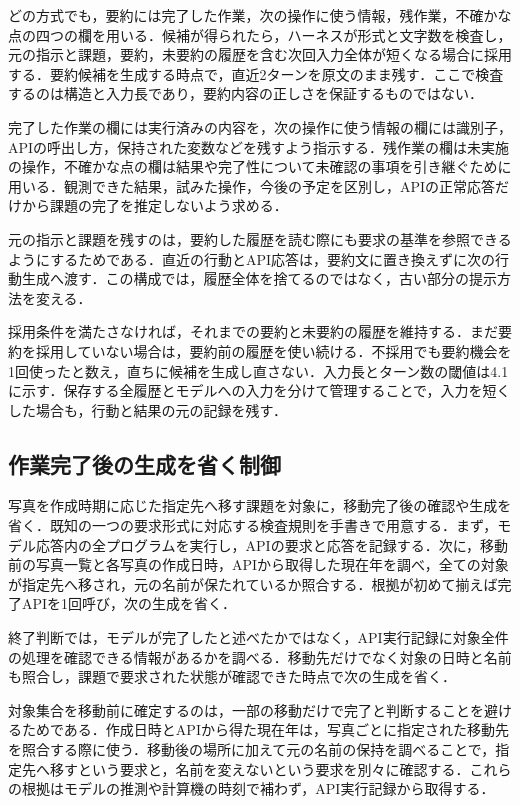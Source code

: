 \documentclass[letter]{ieicej}
\begin{document}
どの方式でも，要約には完了した作業，次の操作に使う情報，残作業，不確かな点の四つの欄を用いる．候補が得られたら，ハーネスが形式と文字数を検査し，元の指示と課題，要約，未要約の履歴を含む次回入力全体が短くなる場合に採用する．要約候補を生成する時点で，直近2ターンを原文のまま残す．ここで検査するのは構造と入力長であり，要約内容の正しさを保証するものではない．

完了した作業の欄には実行済みの内容を，次の操作に使う情報の欄には識別子，APIの呼出し方，保持された変数などを残すよう指示する．残作業の欄は未実施の操作，不確かな点の欄は結果や完了性について未確認の事項を引き継ぐために用いる．観測できた結果，試みた操作，今後の予定を区別し，APIの正常応答だけから課題の完了を推定しないよう求める．

元の指示と課題を残すのは，要約した履歴を読む際にも要求の基準を参照できるようにするためである．直近の行動とAPI応答は，要約文に置き換えずに次の行動生成へ渡す．この構成では，履歴全体を捨てるのではなく，古い部分の提示方法を変える．

採用条件を満たさなければ，それまでの要約と未要約の履歴を維持する．まだ要約を採用していない場合は，要約前の履歴を使い続ける．不採用でも要約機会を1回使ったと数え，直ちに候補を生成し直さない．入力長とターン数の閾値は4.1に示す．保存する全履歴とモデルへの入力を分けて管理することで，入力を短くした場合も，行動と結果の元の記録を残す．

\subsection{作業完了後の生成を省く制御}

写真を作成時期に応じた指定先へ移す課題を対象に，移動完了後の確認や生成を省く．既知の一つの要求形式に対応する検査規則を手書きで用意する．まず，モデル応答内の全プログラムを実行し，APIの要求と応答を記録する．次に，移動前の写真一覧と各写真の作成日時，APIから取得した現在年を調べ，全ての対象が指定先へ移され，元の名前が保たれているか照合する．根拠が初めて揃えば完了APIを1回呼び，次の生成を省く．

終了判断では，モデルが完了したと述べたかではなく，API実行記録に対象全件の処理を確認できる情報があるかを調べる．移動先だけでなく対象の日時と名前も照合し，課題で要求された状態が確認できた時点で次の生成を省く．

対象集合を移動前に確定するのは，一部の移動だけで完了と判断することを避けるためである．作成日時とAPIから得た現在年は，写真ごとに指定された移動先を照合する際に使う．移動後の場所に加えて元の名前の保持を調べることで，指定先へ移すという要求と，名前を変えないという要求を別々に確認する．これらの根拠はモデルの推測や計算機の時刻で補わず，API実行記録から取得する．
\end{document}
